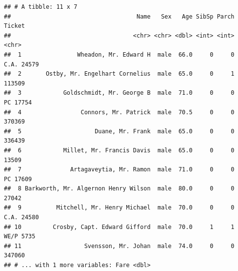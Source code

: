 \documentclass[]{book}
\newenvironment{Shaded}{\begin{snugshade}}{\end{snugshade}}
\newcommand{\KeywordTok}[1]{\textcolor[rgb]{0.13,0.29,0.53}{\textbf{#1}}}
\newcommand{\DecValTok}[1]{\textcolor[rgb]{0.00,0.00,0.81}{#1}}
\newcommand{\FloatTok}[1]{\textcolor[rgb]{0.00,0.00,0.81}{#1}}
\newcommand{\StringTok}[1]{\textcolor[rgb]{0.31,0.60,0.02}{#1}}
\newcommand{\CommentTok}[1]{\textcolor[rgb]{0.56,0.35,0.01}{\textit{#1}}}
\newcommand{\OperatorTok}[1]{\textcolor[rgb]{0.81,0.36,0.00}{\textbf{#1}}}
\newcommand{\NormalTok}[1]{#1}
\theoremstyle{definition}
\theoremstyle{definition}
\theoremstyle{definition}
\theoremstyle{remark}
\begin{document}
\begin{Shaded}
\end{Shaded}

\begin{verbatim}
## # A tibble: 11 x 7
##                                    Name   Sex   Age SibSp Parch     Ticket
##                                   <chr> <chr> <dbl> <int> <int>      <chr>
##  1                Wheadon, Mr. Edward H  male  66.0     0     0 C.A. 24579
##  2       Ostby, Mr. Engelhart Cornelius  male  65.0     0     1     113509
##  3            Goldschmidt, Mr. George B  male  71.0     0     0   PC 17754
##  4                 Connors, Mr. Patrick  male  70.5     0     0     370369
##  5                     Duane, Mr. Frank  male  65.0     0     0     336439
##  6            Millet, Mr. Francis Davis  male  65.0     0     0      13509
##  7              Artagaveytia, Mr. Ramon  male  71.0     0     0   PC 17609
##  8 Barkworth, Mr. Algernon Henry Wilson  male  80.0     0     0      27042
##  9          Mitchell, Mr. Henry Michael  male  70.0     0     0 C.A. 24580
## 10         Crosby, Capt. Edward Gifford  male  70.0     1     1  WE/P 5735
## 11                  Svensson, Mr. Johan  male  74.0     0     0     347060
## # ... with 1 more variables: Fare <dbl>
\end{verbatim}

\begin{Shaded}
\end{Shaded}
\end{document}
